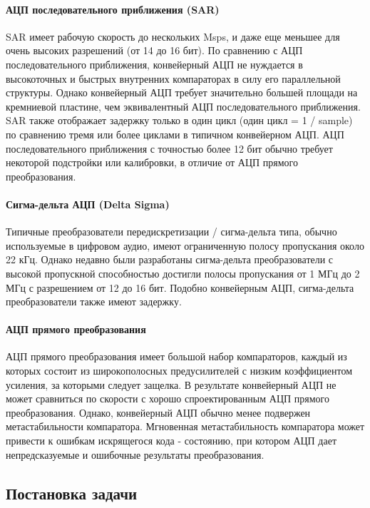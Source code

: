 \documentclass[a4paper,12pt]{article} %
\begin{document}
\paragraph{АЦП последовательного приближения (SAR)}
SAR имеет рабочую скорость до нескольких Msps, и даже еще меньшее для очень высоких разрешений (от 14 до 16 бит). По сравнению с АЦП последовательного приближения, конвейерный АЦП не нуждается в высокоточных и быстрых внутренних компараторах в силу его параллельной структуры. Однако конвейерный АЦП требует значительно большей площади на  кремниевой пластине, чем эквивалентный АЦП последовательного приближения. SAR также отображает задержку только в один цикл (один цикл = 1 / sample) по сравнению тремя или более циклами в типичном конвейерном АЦП. АЦП последовательного приближения с точностью более 12 бит обычно требует некоторой подстройки или калибровки, в отличие от АЦП прямого преобразования. 

\paragraph{Сигма-дельта АЦП (Delta Sigma)}
Типичные преобразователи передискретизации / сигма-дельта типа, обычно используемые в цифровом аудио, имеют ограниченную полосу пропускания около 22 кГц. Однако недавно были разработаны сигма-дельта преобразователи с высокой пропускной способностью достигли полосы пропускания от 1 МГц до 2 МГц с разрешением от 12 до 16 бит. Подобно конвейерным АЦП, сигма-дельта преобразователи также имеют задержку. 

\paragraph{АЦП прямого преобразования}
АЦП прямого преобразования имеет большой набор компараторов, каждый из которых состоит из широкополосных предусилителей с низким коэффициентом усиления, за которыми следует защелка. В результате конвейерный АЦП не может сравниться по скорости с хорошо спроектированным АЦП прямого преобразования. Однако,  конвейерный АЦП обычно менее подвержен метастабильности компаратора. Мгновенная метастабильность компаратора может привести к ошибкам искрящегося кода - состоянию, при котором АЦП дает непредсказуемые и ошибочные результаты преобразования. 


\subsection{Постановка задачи}
\end{document}
